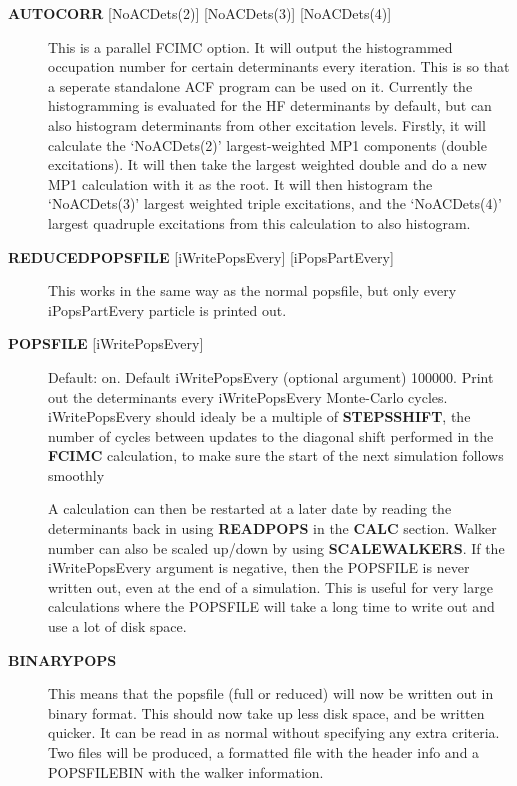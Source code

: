 \documentclass[openany,a4paper,10pt,english]{manual}
\begin{document}
\begin{description}
\item[\textbf{AUTOCORR} {[}NoACDets(2){]} {[}NoACDets(3){]} {[}NoACDets(4){]}] \leavevmode
This is a parallel FCIMC option. It will output the histogrammed occupation number for certain
determinants every iteration. This is so that a seperate standalone ACF program can be used on it.
Currently the histogramming is evaluated for the HF determinants by default, but can also
histogram determinants from other excitation levels. Firstly, it will calculate the `NoACDets(2)'
largest-weighted MP1 components (double excitations). It will then take the largest weighted double
and do a new MP1 calculation with it as the root. It will then histogram the `NoACDets(3)' largest
weighted triple excitations, and the `NoACDets(4)' largest quadruple excitations from this calculation
to also histogram.

\item[\textbf{REDUCEDPOPSFILE} {[}iWritePopsEvery{]} {[}iPopsPartEvery{]}] \leavevmode
This works in the same way as the normal popsfile, but only every iPopsPartEvery particle is printed out.

\item[\textbf{POPSFILE} {[}iWritePopsEvery{]}] \leavevmode
Default: on.  Default iWritePopsEvery (optional argument) 100000.
Print out the determinants every iWritePopsEvery Monte-Carlo cycles.
iWritePopsEvery should idealy be a multiple of \textbf{STEPSSHIFT}, the number of
cycles between updates to the diagonal shift performed in the
\textbf{FCIMC} calculation, to make sure the start of the next simulation follows
smoothly

A calculation can then be restarted at a later date by reading the
determinants back in using \textbf{READPOPS} in the \textbf{CALC} section.
Walker number can also be scaled up/down by using \textbf{SCALEWALKERS}.
If the iWritePopsEvery argument is negative, then the POPSFILE is never
written out, even at the end of a simulation. This is useful for very large
calculations where the POPSFILE will take a long time to write out and use
a lot of disk space.

\item[\textbf{BINARYPOPS}] \leavevmode
This means that the popsfile (full or reduced) will now be written out in binary format.
This should now take up less disk space, and be written quicker. It can be read in as
normal without specifying any extra criteria. Two files will be produced, a formatted
file with the header info and a POPSFILEBIN with the walker information.


\end{description}
\end{document}
